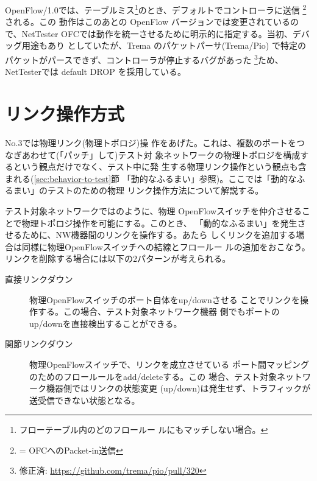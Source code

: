 OpenFlow/1.0では、テーブルミス\footnote{フローテーブル内のどのフロールー
ルにもマッチしない場合。}のとき、デフォルトでコントローラに送信
\footnote{ = OFCへのPacket-in送信}される。この
動作はこのあとの OpenFlow バージョンでは変更されているので、NetTester
OFCでは動作を統一させるために明示的に指定する。当初、デバッグ用途もあり
としていたが、Trema のパケットパーサ(Trema/Pio)
で特定のパケットがパースできず、コントローラが停止するバグがあった
\footnote{修正済: \url{https://github.com/trema/pio/pull/320}}ため、
NetTesterでは default DROP を採用している。

  \section{リンク操作方式}
  \label{sec:link-operation}



 No.3では物理リンク(物理トポロジ)操
作をあげた。これは、複数のポートをつなぎあわせて(「パッチ」して)テスト対
象ネットワークの物理トポロジを構成するという観点だけでなく、テスト中に発
生する物理リンク操作という観点も含まれる(\ref{sec:behavior-to-test}節
「動的なふるまい」参照)。ここでは「動的なふるまい」のテストのための物理
リンク操作方法について解説する。

テスト対象ネットワークではのように、物理
OpenFlowスイッチを仲介させることで物理トポロジ操作を可能にする。このとき、
「動的なふるまい」を発生させるために、NW機器間のリンクを操作する。あたら
しくリンクを追加する場合は同様に物理OpenFlowスイッチへの結線とフロールー
ルの追加をおこなう。リンクを削除する場合には以下の2パターンが考えられる。
\begin{description}
 \item[直接リンクダウン] 物理OpenFlowスイッチのポート自体をup/downさせる
            ことでリンクを操作する。この場合、テスト対象ネットワーク機器
            側でもポートのup/downを直接検出することができる。
 \item[関節リンクダウン] 物理OpenFlowスイッチで、リンクを成立させている
            ポート間マッピングのためのフロールールをadd/deleteする。この
            場合、テスト対象ネットワーク機器側ではリンクの状態変更
            (up/down)は発生せず、トラフィックが送受信できない状態となる。
\end{description}

